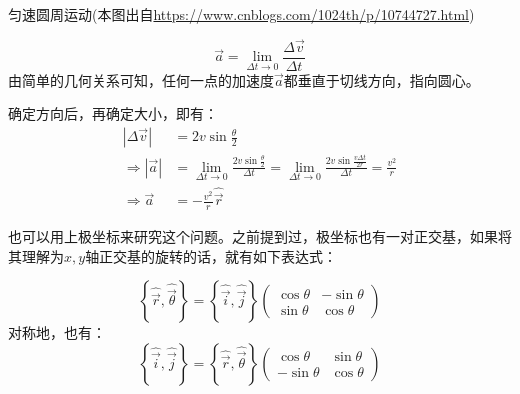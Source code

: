 \vspace*{2ex}
\begin{minipage}{0.9\textwidth}
	\begin{minipage}{0.6\linewidth}
		\begin{center}
			
			匀速圆周运动(本图出自\url{https://www.cnblogs.com/1024th/p/10744727.html})
		\end{center}
	\end{minipage}
	\quad
	\begin{minipage}{0.35\linewidth}
			\[\vec{a}=\lim_{\Delta t \to 0} \frac{\Delta \vec{v}}{\Delta t}\]
				由简单的几何关系可知，任何一点的加速度$\vec{a}$都垂直于切线方向，指向圆心。
	\end{minipage}
\end{minipage}
\vspace*{2ex}

确定方向后，再确定大小，即有：
\begin{equation}
  \begin{aligned}
         \left | \Delta \vec{v} \right |&=2v\sin\frac{\theta}{2} \\
    \Longrightarrow \left | \vec{a} \right |&=\lim_{\Delta t \to 0}  \frac{2v\sin\frac{\theta}{2}}{\Delta t}=\lim_{\Delta t \to 0}  \frac{2v\sin\frac{v\Delta t}{2r}}{\Delta t}=\frac{v^{2}}{r} \\
    \Longrightarrow \vec{a}&=-\frac{v^{2}}{r}\hat{\vec{r}}
  \end{aligned}
  \nonumber
\end{equation}

也可以用上极坐标来研究这个问题。之前提到过，极坐标也有一对正交基，如果将其理解为$x,y$轴正交基的旋转的话，就有如下表达式：

\[\left \{ \hat{\vec{r}},\hat{\vec{\theta}} \right \} =\left \{ \hat{\vec{i}},\hat{\vec{j}} \right \}\begin{pmatrix}
  \cos\theta & -\sin\theta\\
   \sin\theta& \cos\theta
 \end{pmatrix} \]
对称地，也有：
\[\left \{ \hat{\vec{i}},\hat{\vec{j}} \right \} =\left \{ \hat{\vec{r}},\hat{\vec{\theta}} \right \}\begin{pmatrix}
  \cos\theta & \sin\theta\\
  - \sin\theta& \cos\theta
 \end{pmatrix} \]

